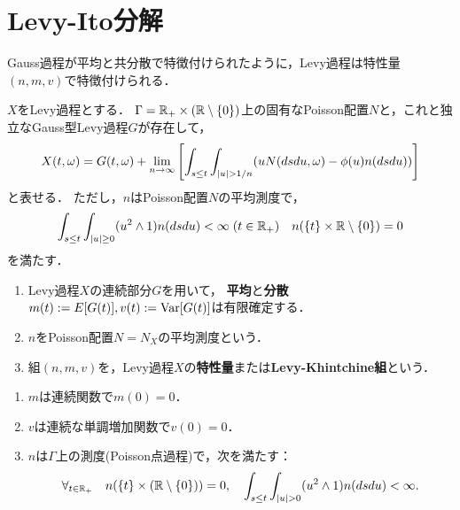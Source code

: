 \documentclass[uplatex,dvipdfmx]{jsreport}
\begin{document}
\section{Levy-Ito分解}

\begin{tcolorbox}[colframe=ForestGreen, colback=ForestGreen!10!white,breakable,colbacktitle=ForestGreen!40!white,coltitle=black,fonttitle=\bfseries\sffamily,
title=]
    Gauss過程が平均と共分散で特徴付けられたように，Levy過程は特性量$(n,m,v)$で特徴付けられる．
\end{tcolorbox}

\begin{theorem}
    $X$をLevy過程とする．
    $\Gamma=\mathbb{R}_+\times(\mathbb{R}\setminus\{0\})$上の固有なPoisson配置$N$と，これと独立なGauss型Levy過程$G$が存在して，
    \[X(t,\omega)=G(t,\omega)+\lim_{n\to\infty}\left[\int_{s\le t}\int_{\lvert u\rvert>1/n}(uN(dsdu,\omega)-\phi(u)n(dsdu))\right]\]
    と表せる．
    ただし，$n$はPoisson配置$N$の平均測度で，
    \[\int_{s\le t}\int_{\lvert u\rvert\ge0}(u^2\land 1)n(dsdu)<\infty\;(t\in\mathbb{R}_+)\quad n(\{t\}\times\mathbb{R}\setminus\{0\})=0\]
    を満たす．
\end{theorem}

\begin{definition}\mbox{}
    \begin{enumerate}
        \item Levy過程$X$の連続部分$G$を用いて，
        \textbf{平均}と\textbf{分散}$m(t):=E[G(t)],v(t):=\mathrm{Var}[G(t)]$は有限確定する．
        \item $n$をPoisson配置$N=N_X$の平均測度という．
        \item 組$(n,m,v)$を，Levy過程$X$の\textbf{特性量}または\textbf{Levy-Khintchine組}という．
    \end{enumerate}
\end{definition}

\begin{lemma}\mbox{}
    \begin{enumerate}
        \item $m$は連続関数で$m(0)=0$．
        \item $v$は連続な単調増加関数で$v(0)=0$．
        \item $n$は$\Gamma$上の測度(Poisson点過程)で，次を満たす：
        \[\forall_{t\in\mathbb{R}_+}\quad n(\{t\}\times(\mathbb{R}\setminus\{0\}))=0,\quad\int_{s\le t}\int_{\lvert u\rvert>0}(u^2\land 1)n(dsdu)<\infty.\]
    \end{enumerate}
\end{lemma}
\end{document}
